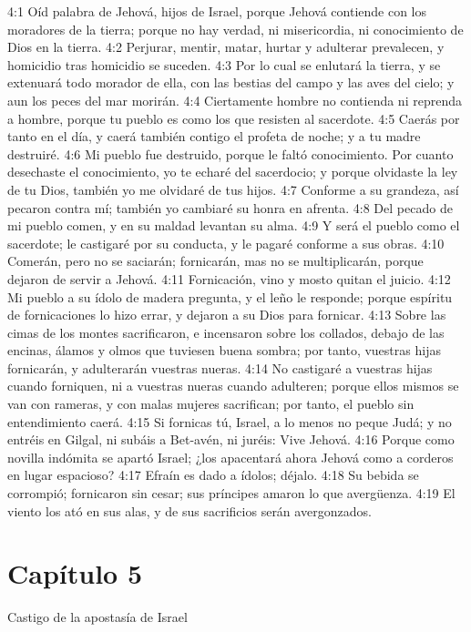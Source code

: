 			4:1 Oíd palabra de Jehová, hijos de Israel, porque Jehová contiende con los moradores de la tierra; porque no hay verdad, ni misericordia, ni conocimiento de Dios en la tierra. 
			4:2 Perjurar, mentir, matar, hurtar y adulterar prevalecen, y homicidio tras homicidio se suceden. 
			4:3 Por lo cual se enlutará la tierra, y se extenuará todo morador de ella, con las bestias del campo y las aves del cielo; y aun los peces del mar morirán. 
			4:4 Ciertamente hombre no contienda ni reprenda a hombre, porque tu pueblo es como los que resisten al sacerdote. 
			4:5 Caerás por tanto en el día, y caerá también contigo el profeta de noche; y a tu madre destruiré. 
			4:6 Mi pueblo fue destruido, porque le faltó conocimiento. Por cuanto desechaste el conocimiento, yo te echaré del sacerdocio; y porque olvidaste la ley de tu Dios, también yo me olvidaré de tus hijos. 
			4:7 Conforme a su grandeza, así pecaron contra mí; también yo cambiaré su honra en afrenta. 
			4:8 Del pecado de mi pueblo comen, y en su maldad levantan su alma. 
			4:9 Y será el pueblo como el sacerdote; le castigaré por su conducta, y le pagaré conforme a sus obras. 
			4:10 Comerán, pero no se saciarán; fornicarán, mas no se multiplicarán, porque dejaron de servir a Jehová. 
			4:11 Fornicación, vino y mosto quitan el juicio. 
			4:12 Mi pueblo a su ídolo de madera pregunta, y el leño le responde; porque espíritu de fornicaciones lo hizo errar, y dejaron a su Dios para fornicar. 
			4:13 Sobre las cimas de los montes sacrificaron, e incensaron sobre los collados, debajo de las encinas, álamos y olmos que tuviesen buena sombra; por tanto, vuestras hijas fornicarán, y adulterarán vuestras nueras. 
			4:14 No castigaré a vuestras hijas cuando forniquen, ni a vuestras nueras cuando adulteren; porque ellos mismos se van con rameras, y con malas mujeres sacrifican; por tanto, el pueblo sin entendimiento caerá. 
			4:15 Si fornicas tú, Israel, a lo menos no peque Judá; y no entréis en Gilgal, ni subáis a Bet-avén, ni juréis: Vive Jehová. 
			4:16 Porque como novilla indómita se apartó Israel; ¿los apacentará ahora Jehová como a corderos en lugar espacioso? 
			4:17 Efraín es dado a ídolos; déjalo. 
			4:18 Su bebida se corrompió; fornicaron sin cesar; sus príncipes amaron lo que avergüenza. 
			4:19 El viento los ató en sus alas, y de sus sacrificios serán avergonzados. 
			\section*{Capítulo 5}
				Castigo de la apostasía de Israel 
				
